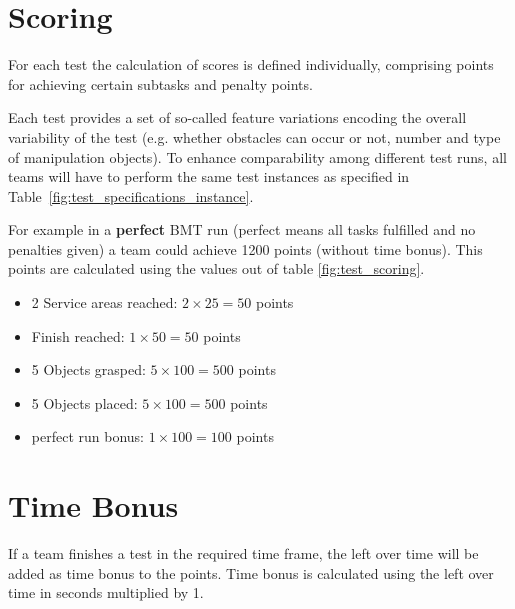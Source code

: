 \section{Scoring} \label{sec:ScoringAndRanking}

For each test the calculation of scores is defined individually, comprising points for achieving certain subtasks and penalty points.

Each test provides a set of so-called feature variations encoding the overall variability of the test (e.g. whether
obstacles can occur or not, number and type of manipulation objects). To enhance comparability among different test
runs, all teams will have to perform the same test instances as specified in Table~\ref{fig:test_specifications_instance}.

For example in a \textbf{perfect} BMT run (perfect means all tasks fulfilled and no penalties given) a team could achieve 1200 points (without time bonus). This points are calculated using the values out of table \ref{fig:test_scoring}.

\begin{itemize}
	\item 2 Service areas reached: $2 \times 25 = 50$ points
	\item Finish reached: $1 \times 50 = 50 $ points
	\item 5 Objects grasped: $5 \times 100 = 500 $ points
	\item 5 Objects placed: $5 \times 100 = 500  $ points
	\item perfect run bonus: $1 \times 100 = 100 $ points
\end{itemize}


\section{Time Bonus}
If a team finishes a test in the required time frame, the left over time will be added as time bonus to the points. 
Time bonus is calculated using the left over time in seconds multiplied by 1. 


